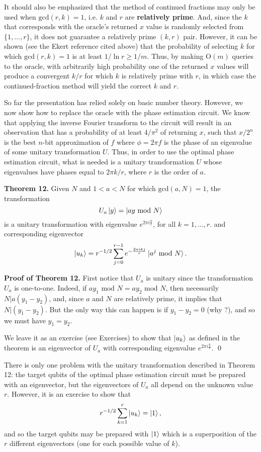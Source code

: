 \documentclass [12pt]{article}
\theoremstyle{definition}
\begin{document}
It should also be emphasized that the method of continued fractions may only be used when $\mbox{gcd}(r,k)=1$, i.e. $k$ and $r$ are \textbf{relatively prime}. 
And, since the $k$ that corresponds with the  oracle's returned $x$ value is randomly selected from $\{1,\ldots,r\}$, it  does not guarantee a relatively prime $(k,r)$ pair. However, it can be shown (see the Ekert reference cited above)
that the probability of selecting $k$ for which $\mbox{gcd}(r,k)=1$ is at least $1/\ln r \geq 1/m$. Thus, by making $\mbox{O}(m)$ queries to the oracle, with
arbitrarily high probability one of the returned $x$ values will 
produce a convergent $k/r$ for which $k$ is relatively prime with $r$, in which case the continued-fraction method will yield the correct $k$ and $r$.



So far the presentation has relied solely on basic number theory. However, we now show how to replace the oracle with the phase estimation circuit. We know that applying 
the inverse Fourier transform to the circuit will result in an observation that has a probability of at least $4/\pi^2$ of returning $x$, such that
$x/2^n$ is the best $n$-bit approximation of $f$ where $\phi = 2\pi f$ is the phase of an eigenvalue of some unitary transformation $U$. Thus, in order to use the optimal 
phase estimation circuit, what is needed is a unitary transformation $U$ whose eigenvalues have phases equal to $2\pi k/r$, where $r$ is the order of $a$.

\textbf{Theorem 12.} Given $N$ and $1 < a < N$ for which $\mbox{gcd}(a,N)=1$, the transformation 
 \[U_a\ket{y} = \ket{ay\mbox{ mod } N}\]
 is a unitary transformation with eigenvalue  $e^{2\pi i\frac{k}{r}}$, for all $k=1,\ldots,r$. and corresponding eigenvector 
 \[\ket{u_k} = r^{-1/2}\sum_{j=0}^{r-1}e^{-\frac{2\pi ikj}{r}}\ket{a^j\mbox{ mod } N}.\]

\textbf{Proof of Theorem 12.} First notice that $U_a$ is unitary since the transformation $U_a$ is one-to-one. Indeed, if
$ay_1 \mbox{ mod } N = ay_2 \mbox{ mod } N$, then necessarily $N|a(y_1-y_2)$, and, since $a$ and $N$ are relatively prime, it implies that $N|(y_1-y_2)$. But the only way this
can happen is if $y_1-y_2 =0$ (why ?), and so we must have $y_1=y_2$. 

We leave it as an exercise (see Exercises) to show that $\ket{u_k}$ as defined in the theorem is an eigenvector of $U_a$ with corresponding eigenvalue $e^{2\pi i\frac{k}{r}}$.
\qed


There is only one problem with the unitary transformation described in Theorem 12: the target qubits of the optimal phase estimation circuit must be prepared with an eigenvector, but the eigenvectors of $U_a$ all depend on the unknown
value $r$. However, it is an exercise to show that
\[r^{-1/2}\sum_{k=1}^r\ket{u_k} = \ket{1},\]
and so the target qubits may be prepared with $\ket{1}$ which is a superposition of the $r$ different eigenvectors (one for each possible value of $k$).
\end{document}
